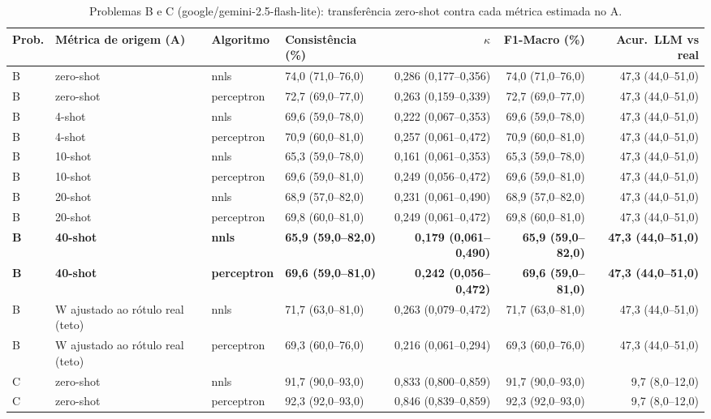 \begin{table}[htbp]
\centering
\small
\caption{Problemas B e C (google/gemini-2.5-flash-lite): transferência zero-shot contra cada métrica estimada no A.}
\label{tab:T2_BC_flashlite}
\begin{tabular}{llllrrr}
\toprule
Prob. & Métrica de origem (A) & Algoritmo & Consistência (\%) & $\kappa$ & F1-Macro (\%) & Acur.\ LLM vs real \\
\midrule
B & zero-shot & nnls & 74,0 (71,0–76,0) & 0,286 (0,177–0,356) & 74,0 (71,0–76,0) & 47,3 (44,0–51,0) \\
B & zero-shot & perceptron & 72,7 (69,0–77,0) & 0,263 (0,159–0,339) & 72,7 (69,0–77,0) & 47,3 (44,0–51,0) \\
B & 4-shot & nnls & 69,6 (59,0–78,0) & 0,222 (0,067–0,353) & 69,6 (59,0–78,0) & 47,3 (44,0–51,0) \\
B & 4-shot & perceptron & 70,9 (60,0–81,0) & 0,257 (0,061–0,472) & 70,9 (60,0–81,0) & 47,3 (44,0–51,0) \\
B & 10-shot & nnls & 65,3 (59,0–78,0) & 0,161 (0,061–0,353) & 65,3 (59,0–78,0) & 47,3 (44,0–51,0) \\
B & 10-shot & perceptron & 69,6 (59,0–81,0) & 0,249 (0,056–0,472) & 69,6 (59,0–81,0) & 47,3 (44,0–51,0) \\
B & 20-shot & nnls & 68,9 (57,0–82,0) & 0,231 (0,061–0,490) & 68,9 (57,0–82,0) & 47,3 (44,0–51,0) \\
B & 20-shot & perceptron & 69,8 (60,0–81,0) & 0,249 (0,061–0,472) & 69,8 (60,0–81,0) & 47,3 (44,0–51,0) \\
\textbf{B} & \textbf{40-shot} & \textbf{nnls} & \textbf{65,9 (59,0–82,0)} & \textbf{0,179 (0,061–0,490)} & \textbf{65,9 (59,0–82,0)} & \textbf{47,3 (44,0–51,0)} \\
\textbf{B} & \textbf{40-shot} & \textbf{perceptron} & \textbf{69,6 (59,0–81,0)} & \textbf{0,242 (0,056–0,472)} & \textbf{69,6 (59,0–81,0)} & \textbf{47,3 (44,0–51,0)} \\
B & W ajustado ao rótulo real (teto) & nnls & 71,7 (63,0–81,0) & 0,263 (0,079–0,472) & 71,7 (63,0–81,0) & 47,3 (44,0–51,0) \\
B & W ajustado ao rótulo real (teto) & perceptron & 69,3 (60,0–76,0) & 0,216 (0,061–0,294) & 69,3 (60,0–76,0) & 47,3 (44,0–51,0) \\
\midrule
C & zero-shot & nnls & 91,7 (90,0–93,0) & 0,833 (0,800–0,859) & 91,7 (90,0–93,0) & 9,7 (8,0–12,0) \\
C & zero-shot & perceptron & 92,3 (92,0–93,0) & 0,846 (0,839–0,859) & 92,3 (92,0–93,0) & 9,7 (8,0–12,0) \\

\end{tabular}
\end{table}
